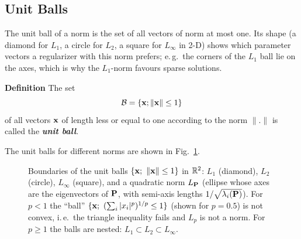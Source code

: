 \subsection{Unit Balls}

The unit ball of a norm is the set of all vectors of norm at most one. Its shape (a diamond for $L_1$, a circle for $L_2$, a square for $L_\infty$ in 2-D) shows which parameter vectors a regularizer with this norm prefers; e.\,g.\ the corners of the $L_1$ ball lie on the axes, which is why the $L_1$-norm favours sparse solutions. 

  \textbf{Definition}
    The set
    \begin{displaymath}
      {\cal B} = \{ \bm{\mathrm{x}}; \|\bm{\mathrm{x}}\| \leq 1\}
    \end{displaymath}
    of all vectors $\bm{\mathrm{x}}$ of length less or equal to one according to the norm $\|.\|$  is called the \textbf{\emph{unit ball}}.
   
 The unit balls for different norms are shown in Fig.~\ref{fig:unitballs}.
  \begin{figure}[htbp]
    \centering
    \caption{Boundaries of the unit balls $\{\bm{\mathrm{x}};\ \|\bm{\mathrm{x}}\|\le1\}$ in $\mathbb{R}^2$: $L_1$ (diamond), $L_2$ (circle), $L_\infty$ (square), and a quadratic norm $L_{\mathbf{P}}$ (ellipse whose axes are the eigenvectors of $\mathbf{P}$, with semi-axis lengths $1/\sqrt{\lambda_i(\mathbf{P})}$). For $p<1$ the ``ball'' $\{\vect x;\ (\sum_i|x_i|^p)^{1/p}\le1\}$ (shown for $p=0.5$) is not convex, i.\,e.\ the triangle inequality fails and $L_p$ is not a norm. For $p\ge1$ the balls are nested: $L_1\subset L_2\subset L_\infty$.}
    \label{fig:unitballs}
  \end{figure}

